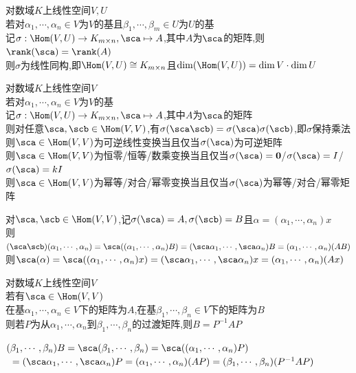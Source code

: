 \begin{dingli}
对数域$K$上线性空间$V,U$\\
若对$\alpha_1,\cdots,\alpha_n\in V$为$V$的基且$\beta_1,\cdots,\beta_m\in U$为$U$的基\\
记$\sigma:\Hom(V,U)\to K_{m\times n},\sca\mapsto A$,其中$A$为$\sca$的矩阵,则$\rank(\sca)=\rank(A)$\\
则$\sigma$为线性同构,即$\Hom(V,U)\cong K_{m\times n}$且$\dim(\Hom(V,U))=\dim V\cdot\dim U$
\end{dingli}

\begin{dingli}
对数域$K$上线性空间$V$\\
若对$\alpha_1,\cdots,\alpha_n\in V$为$V$的基\\
记$\sigma:\Hom(V,U)\to K_{m\times n},\sca\mapsto A$,其中$A$为$\sca$的矩阵\\
则对任意$\sca,\scb\in\Hom(V,V)$,有$\sigma(\sca\scb)=\sigma(\sca)\sigma(\scb)$,即$\sigma$保持乘法\\
则$\sca\in \Hom(V,V)$为可逆线性变换当且仅当$\sigma(\sca)$为可逆矩阵\\
则$\sca\in \Hom(V,V)$为恒零/恒等/数乘变换当且仅当$\sigma(\sca)={\bf0}$/$\sigma(\sca)=I$/$\sigma(\sca)=kI$\\
则$\sca\in \Hom(V,V)$为幂等/对合/幂零变换当且仅当$\sigma(\sca)$为幂等/对合/幂零矩阵
\end{dingli}

\begin{zhu}
对$\sca,\scb\in \Hom(V,V)$,记$\sigma(\sca)=A,\sigma(\scb)=B$且$\alpha=(\alpha_1,\cdots,\alpha_n)x$\\
则$(\sca\scb)(\alpha_1,\cdots,\alpha_n)=\sca((\alpha_1,\cdots,\alpha_n)B)=(\sca\alpha_1,\cdots,\sca\alpha_n)B=(\alpha_1,\cdots,\alpha_n)(AB)$\\
则$\sca(\alpha)=\sca((\alpha_1,\cdots,\alpha_n)x)=(\sca\alpha_1,\cdots,\sca\alpha_n)x=(\alpha_1,\cdots,\alpha_n)(Ax)$
\end{zhu}

\begin{dingli}
对数域$K$上线性空间$V$\\
若有$\sca\in \Hom(V,V)$\\
在基$\alpha_1,\cdots,\alpha_n\in V$下的矩阵为$A$,在基$\beta_1,\cdots,\beta_n\in V$下的矩阵为$B$\\
则若$P$为从$\alpha_1,\cdots,\alpha_n$到$\beta_1,\cdots,\beta_n$的过渡矩阵,则$B=P^{-1}AP$
\end{dingli}

\begin{zhu}
$(\beta_1,\cdots,\beta_n)B=\sca(\beta_1,\cdots,\beta_n)=\sca((\alpha_1,\cdots,\alpha_n)P)$\\
$\ \ =(\sca\alpha_1,\cdots,\sca\alpha_n)P=(\alpha_1,\cdots,\alpha_n)(AP)=(\beta_1,\cdots,\beta_n)(P^{-1}AP)$
\end{zhu}

